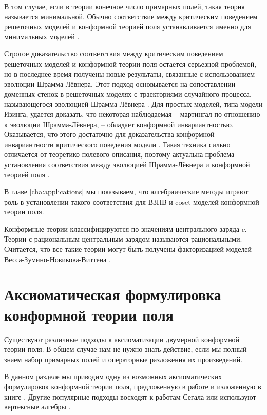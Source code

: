 В том случае, если в теории конечное число примарных полей, такая теория называется минимальной.  Обычно соответствие между критическим поведением решеточных моделей и конформной теорией поля устанавливается именно для минимальных моделей \cite{belavin1984ics}.  

Строгое доказательство соответствия между критическим поведением решеточных моделей и конформной теории поля остается серьезной проблемой, но  в последнее время получены новые результаты, связанные с использованием  эволюции Шрамма-Лёвнера. Этот подход основывается на сопоставлении доменных стенок в решеточных моделях с траекториями случайного процесса, называющегося эволюцией Шрамма-Лёвнера \cite{schramm2000scaling}. Для простых моделей, типа модели Изинга, удается доказать, что некоторая наблюдаемая --  мартингал по отношению к эволюции Шрамма-Лёвнера, -- обладает конформной инвариантностью. Оказывается, что этого достаточно для доказательства конформной инвариантности критического поведения модели \cite{duminil2011conformal}. Такая техника сильно отличается от теоретико-полевого описания, поэтому актуальна проблема установления соответствия между эволюцией Шрамма-Лёвнера и конформной теорией поля \cite{bauer2002sle,bauer2003conformal,bauer2003sle,bauer2004cfts,bauer2004sle,bauer2004conformal}. 

В главе \ref{cha:applications} мы показываем, что алгебраические методы играют роль в установлении такого соответствия для ВЗНВ и coset-моделей конформной теории поля. 

Конформные теории классифицируются по значениям центрального заряда $c$. Теории с рациональным
центральным зарядом называются рациональными. Считается, что все такие теории могут быть получены
факторизацией моделей Весса-Зумино-Новикова-Виттена \cite{moore1989taming}.


\section{Аксиоматическая формулировка конформной теории поля}
\label{sec:conformal-field-theory-general}


Существуют различные подходы к аксиоматизации двумерной конформной теории поля. В общем случае нам
не нужно знать действие, если мы полный знаем набор примарных полей и операторные разложения их
произведений. 

В данном разделе мы приводим одну из возможных аксиоматических формулировок конформной теории поля, предложенную в работе \cite{felder1989structure} и изложенную в книге \cite{schottenloher2008mathematical}. Другие популярные подходы восходят к работам Сегала \cite{segal1987definition} или используют вертексные алгебры \cite{kac1998vertex}. 


